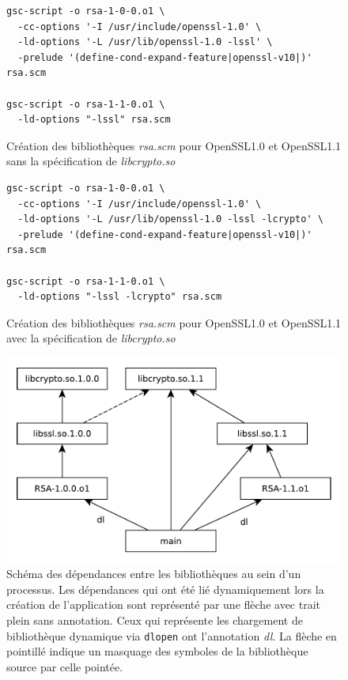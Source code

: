 \documentclass[12pt,initial,twoside,maitrise]{dms}
\numberwithin{equation}{section}
\numberwithin{table}{chapter}
\numberwithin{figure}{chapter}
\begin{document}
\begin{center}
\begin{figure}[ht]
\begin{lstlisting}[frame=single]
gsc-script -o rsa-1-0-0.o1 \
  -cc-options '-I /usr/include/openssl-1.0' \
  -ld-options '-L /usr/lib/openssl-1.0 -lssl' \
  -prelude '(define-cond-expand-feature|openssl-v10|)' rsa.scm

gsc-script -o rsa-1-1-0.o1 \
  -ld-options "-lssl" rsa.scm
\end{lstlisting}
\caption{Création des bibliothèques \textit{rsa.scm} pour OpenSSL1.0 et OpenSSL1.1
sans la spécification de \textit{libcrypto.so}}
\label{fig:scm_masq1}
\end{figure}
\end{center}

\begin{center}
\begin{figure}[ht]
\begin{lstlisting}[frame=single]
gsc-script -o rsa-1-0-0.o1 \
  -cc-options '-I /usr/include/openssl-1.0' \
  -ld-options '-L /usr/lib/openssl-1.0 -lssl -lcrypto' \
  -prelude '(define-cond-expand-feature|openssl-v10|)' rsa.scm

gsc-script -o rsa-1-1-0.o1 \
  -ld-options "-lssl -lcrypto" rsa.scm
\end{lstlisting}
\caption{Création des bibliothèques \textit{rsa.scm} pour OpenSSL1.0 et OpenSSL1.1
avec la spécification de \textit{libcrypto.so}}
\label{fig:scm_masq_fix1}
\end{figure}
\end{center}

\begin{center}
\begin{figure}[ht]
\includegraphics{figures/libssl_masking.pdf}
\caption{Schéma des dépendances entre les bibliothèques au sein d'un processus.
Les dépendances qui ont été lié dynamiquement lors la création de l'application sont représenté par une flèche avec
trait plein sans annotation. Ceux qui représente les chargement de bibliothèque dynamique via \texttt{dlopen} ont
l'annotation \textit{dl}. La flèche en pointillé indique un masquage des symboles de la bibliothèque
source par celle pointée.}
\label{fig:scm_masq_schema}
\end{figure}
\end{center}
\end{document}
